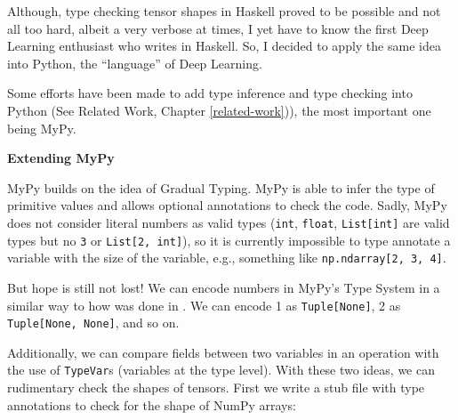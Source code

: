 \documentclass[
11pt, %
english, %
singlespacing, %
headsepline, %
]{MastersDoctoralThesis} %
\newcommand{\nonsection}[1]{\vspace{3mm}\noindent\textbf{\large #1}\vspace{2mm}}
\begin{document}
Although, type checking tensor shapes in Haskell proved to be possible
and not all too hard, albeit a very verbose at times, I yet have to know
the first Deep Learning enthusiast who writes in Haskell. So, I decided
to apply the same idea into Python, the \enquote{language} of Deep
Learning.

Some efforts have been made to add type inference and type checking into
Python (See Related Work, Chapter \ref{related-work})), the most
important one being MyPy.

{\nonsection{Extending MyPy}}

MyPy builds on the idea of Gradual Typing. MyPy is able to infer the
type of primitive values and allows optional annotations to check the
code. Sadly, MyPy does not consider literal numbers as valid types
(\texttt{int}, \texttt{float}, \texttt{List{[}int{]}} are valid types
but no \texttt{3} or \texttt{List{[}2,\ int{]}}), so it is currently
impossible to type annotate a variable with the size of the variable,
e.g., something like \texttt{np.ndarray{[}2,\ 3,\ 4{]}}.

But hope is still not lost! We can encode numbers in MyPy's Type System
in a similar way to how was done in
\autocites{chen_typesafe_2017}{eaton_statically_2006}. We can encode 1
as \texttt{Tuple{[}None{]}}, 2 as \texttt{Tuple{[}None,\ None{]}}, and
so on.

Additionally, we can compare fields between two variables in an
operation with the use of \texttt{TypeVar}s (variables at the type
level). With these two ideas, we can rudimentary check the shapes of
tensors. First we write a stub file \autocite{pep484} with type
annotations to check for the shape of NumPy arrays:
\end{document}
